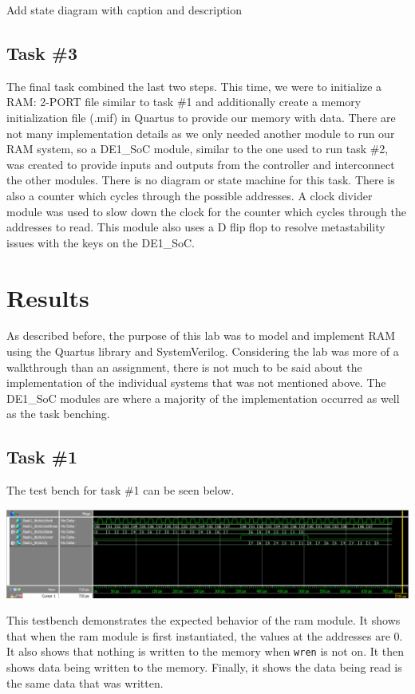 \documentclass[11pt, titlepage]{article}
\begin{document}
            Add state diagram with caption and description
        
        \subsection{Task \#3}
            The final task combined the last two steps. This time, we were to initialize a RAM: 2-PORT file similar to task \#1 and additionally create a memory initialization file (.mif) in Quartus to provide our memory with data. There are not many implementation details as we only needed another module to run our RAM system, so a DE1\_SoC module, similar to the one used to run task \#2, was created to provide inputs and outputs from the controller and interconnect the other modules. There is no diagram or state machine for this task. There is also a counter which cycles through the possible addresses. A clock divider module was used to slow down the clock for the counter which cycles through the addresses to read. This module also uses a D flip flop to resolve metastability issues with the keys on the DE1\_SoC. 
    

    \section{Results}
        As described before, the purpose of this lab was to model and implement RAM using the Quartus library and SystemVerilog. Considering the lab was more of a walkthrough than an assignment, there is not much to be said about the implementation of the individual systems that was not mentioned above. The DE1\_SoC modules are where a majority of the implementation occurred as well as the task benching.

        \subsection{Task \#1}
            The test bench for task \#1 can be seen below.
            \begin{center}
                \includegraphics[scale = 0.5]{Images/task 1 testbench.png}
            \end{center}
            This testbench demonstrates the expected behavior of the ram module. It shows that when the ram module is first instantiated, the values at the addresses are 0. It also shows that nothing is written to the memory when \texttt{wren} is not on. It then shows data being written to the memory. Finally, it shows the data being read is the same data that was written.
\end{document}

